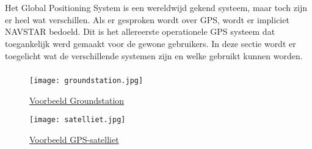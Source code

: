\chapter{}
\label{ch:stand-van-zaken}


\section{}
Het Global Positioning System is een wereldwijd gekend systeem, maar toch zijn er heel wat verschillen. Als er gesproken wordt over GPS, wordt er impliciet NAVSTAR bedoeld. Dit is het allereerste operationele GPS systeem dat toegankelijk werd gemaakt voor de gewone gebruikers. In deze sectie wordt er toegelicht wat de verschillende systemen zijn en welke gebruikt kunnen worden.

\subsection{}
\begin{figure}
	\texttt{[image: groundstation.jpg]}
	\caption{\href{https://www.esa.int/About_Us/ESAC/Cebreros_ground_stationt}{Voorbeeld Groundstation}}
	\label{fig:groundstation}
\end{figure}
\begin{figure}
	\texttt{[image: satelliet.jpg]}
	\caption{\href{https://spacenews.com/40530gps-2f-6-navigation-satellite-slated-to-launch-on-may-15/}{Voorbeeld GPS-satelliet}}
	\label{fig:satelliet}
\end{figure}


